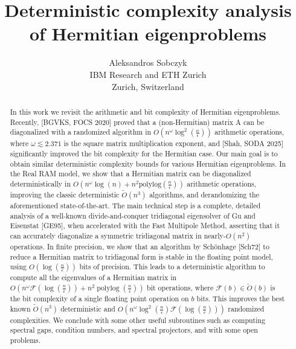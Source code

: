 \documentclass{article}
\title{Deterministic complexity analysis of Hermitian eigenproblems}
\author{Aleksandros Sobczyk 
\\IBM Research and ETH Zurich
\\Zurich, Switzerland}
\date{}
\DeclareMathOperator{\polylog}{polylog}
\newcommand\matA{\boldsymbol{\mathrm{A}}}
\newcommand{\flopcost}{\mathcal{F}}
\begin{document}
\maketitle
\begin{abstract}
In this work we revisit the arithmetic and bit complexity of Hermitian eigenproblems. Recently, [BGVKS, FOCS 2020] proved that a (non-Hermitian) matrix $\matA$ can be diagonalized with a randomized algorithm in $O(n^{\omega}\log^2(\tfrac{n}{\epsilon}))$ arithmetic operations, where $\omega\lesssim 2.371$ is the square matrix multiplication exponent, and [Shah, SODA 2025] significantly improved the bit complexity for the Hermitian case. Our main goal is to obtain similar deterministic complexity bounds for various Hermitian eigenproblems. 
In the Real RAM model, we show that a Hermitian matrix can be diagonalized deterministically in $O(n^{\omega}\log(n)+n^2\mathrm{polylog}(\tfrac{n}{\epsilon}))$ arithmetic operations, improving the classic deterministic $\widetilde O(n^3)$ algorithms, and derandomizing the aforementioned state-of-the-art. 
The main technical step is a complete, detailed analysis of a well-known divide-and-conquer tridiagonal eigensolver of Gu and Eisenstat [GE95], when accelerated with the Fast Multipole Method, asserting that it can accurately diagonalize a symmetric tridiagonal matrix in nearly-$O(n^2)$ operations.
In finite precision, we show that an algorithm by Sch\"onhage [Sch72] to reduce a Hermitian matrix to tridiagonal form is stable in the floating point model, using $O(\log(\tfrac{n}{\epsilon}))$ bits of precision. This leads to a deterministic algorithm to compute all the eigenvalues of a Hermitian matrix in $O\left( n^{\omega}\flopcost\left(\log(\tfrac{n}{\epsilon})\right) + n^2\polylog(\tfrac{n}{\epsilon})\right)$ bit operations, where $\flopcost(b)\in\widetilde O(b)$ is the bit complexity of a single floating point operation on $b$ bits. This improves the best known $\widetilde{O}(n^3)$ deterministic and $O\left( n^{\omega}\log^2(\tfrac{n}{\epsilon})\mathcal{F}\left(\log(\tfrac{n}{\epsilon})\right)\right)$ randomized complexities. We conclude with some other useful subroutines such as computing spectral gaps, condition numbers, and spectral projectors, and with some open problems.
\end{abstract}
\newpage
\tableofcontents
\newpage
\end{document}
